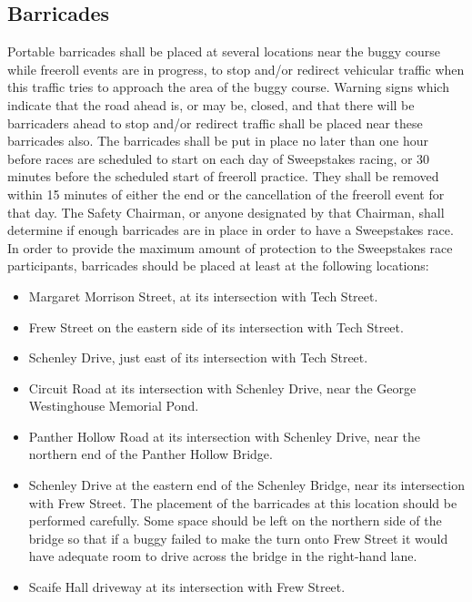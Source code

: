 \subsection{Barricades}
\label{subsec:Barricades}

	Portable barricades shall be placed at several locations near the buggy course while freeroll events are in progress, to stop and/or redirect vehicular traffic when this traffic tries to approach the area of the buggy course. Warning signs which indicate that the road ahead is, or may be, closed, and that there will be barricaders ahead to stop and/or redirect traffic shall be placed near these barricades also. The barricades shall be put in place no later than one hour before races are scheduled to start on each day of Sweepstakes racing, or 30 minutes before the scheduled start of freeroll practice. They shall be removed within 15 minutes of either the end or the cancellation of the freeroll event for that day. The Safety Chairman, or anyone designated by that Chairman, shall determine if enough barricades are in place in order to have a Sweepstakes race. In order to provide the maximum amount of protection to the Sweepstakes race participants, barricades should be placed at least at the following locations:

	\begin{itemize}

		\item Margaret Morrison Street, at its intersection with Tech Street.

		\item Frew Street on the eastern side of its intersection with Tech Street.

		\item Schenley Drive, just east of its intersection with Tech Street.

		\item Circuit Road at its intersection with Schenley Drive, near the George Westinghouse Memorial Pond.

		\item Panther Hollow Road at its intersection with Schenley Drive, near the northern end of the Panther Hollow Bridge.

		\item Schenley Drive at the eastern end of the Schenley Bridge, near its intersection with Frew Street. The placement of the barricades at this location should be performed carefully. Some space should be left on the northern side of the bridge so that if a buggy failed to make the turn onto Frew Street it would have adequate room to drive across the bridge in the right-hand lane.

		\item Scaife Hall driveway at its intersection with Frew Street.

	\end{itemize}

